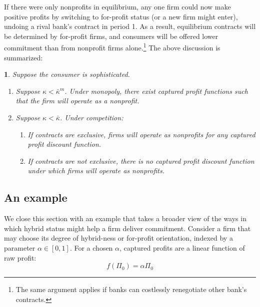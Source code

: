 \documentclass[11pt,english]{article}
\theoremstyle{plain}
\newtheorem{prop}{\protect\propositionname}
\theoremstyle{definition}
\providecommand{\propositionname}{Proposition}
\begin{document}
If there were only nonprofits in equilibrium, any one firm could now make
positive profits by switching to for-profit status (or a new firm might enter), undoing a rival
bank's contract in period 1. As a result, equilibrium contracts will be
determined by for-profit firms, and consumers will be offered lower
commitment than from nonprofit firms alone.\footnote{The same argument applies if banks can costlessly renegotiate other bank's contracts.} 
The above discussion is summarized: 
\begin{prop}
Suppose the consumer is sophisticated.
\begin{enumerate} [label=\alph*)]
\item Suppose $\kappa<\bar{\kappa}^{m}$. Under monopoly, there exist
captured profit functions such that the firm will operate as a nonprofit.

\item Suppose $\kappa<\bar{\kappa}$. Under competition:
\begin{enumerate} [label=\roman*)]
\item If contracts
are exclusive, firms will operate as nonprofits for any captured profit
discount function.
\item If contracts are not exclusive, there is no
captured profit discount function under which firms will operate as
nonprofits. 
\end{enumerate}
\end{enumerate}
\end{prop}

\subsection{An example}

We close this section with an example that takes a broader view of the ways in which hybrid status might help a firm deliver commitment. Consider a firm that may choose its degree of
hybrid-ness or for-profit orientation, indexed by a parameter $\alpha\in\left[0,1\right]$.
For a chosen $\alpha$, captured profits are a linear function of raw profit:
\begin{equation}
f\left(\Pi_{0}\right)=\alpha\Pi_{0}
\end{equation}
\end{document}
